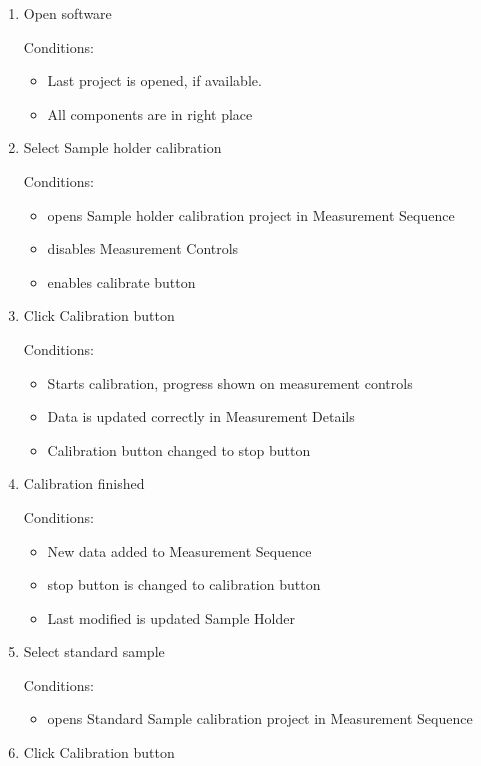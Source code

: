 \begin{enumerate}

\item Open software

Conditions:
\begin{itemize}
\item Last project is opened, if available.
\item All components are in right place
\end{itemize}

\item Select Sample holder calibration

Conditions:
\begin{itemize}
\item opens Sample holder calibration project in Measurement Sequence
\item disables Measurement Controls
\item enables calibrate button
\end{itemize}

\item Click Calibration button

Conditions:
\begin{itemize}
\item Starts calibration, progress shown on measurement controls
\item Data is updated correctly in Measurement Details
\item Calibration button changed to stop button
\end{itemize}

\item Calibration finished

Conditions:
\begin{itemize}
\item New data added to Measurement Sequence
\item stop button is changed to calibration button
\item Last modified is updated Sample Holder
\end{itemize}

\item Select standard sample

Conditions:
\begin{itemize}
\item opens Standard Sample calibration project in Measurement Sequence
\end{itemize}

\item Click Calibration button


\end{enumerate}
